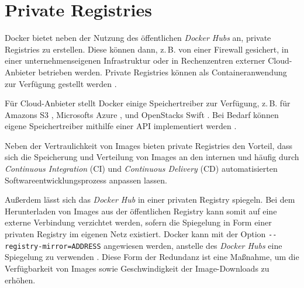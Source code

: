 \documentclass[../main.tex]{subfiles}
\begin{document}



  \section{Private Registries}
    Docker bietet neben der Nutzung des öffentlichen \emph{Docker Hubs} an, private Registries zu erstellen. Diese können dann, z.\,B. von einer Firewall gesichert, in einer unternehmenseigenen Infrastruktur oder in Rechenzentren externer Cloud-Anbieter betrieben werden. Private Registries können als Containeranwendung zur Verfügung gestellt werden \cite{dockerRegistry}.

    \clearpage

    Für Cloud-Anbieter stellt Docker einige Speichertreiber zur Verfügung, z.\,B. für Amazons S3 \cite{dockerStorageDriverS3}, Microsofts Azure \cite{dockerStorageDriverAzure}, und OpenStacks Swift \cite{dockerStorageDriverSwift}. Bei Bedarf können eigene Speichertreiber mithilfe einer API implementiert werden \cite{dockerStorageDriver}.

    Neben der Vertraulichkeit von Images bieten private Registries den Vorteil, dass sich die Speicherung und Verteilung von Images an den internen und häufig durch \emph{Continuous Integration} (\acrshort{CI}) und \emph{Continuous Delivery} (\acrshort{CD}) automatisierten Softwareentwicklungsprozess anpassen lassen.

    Außerdem lässt sich das \emph{Docker Hub} in einer privaten Registry spiegeln. Bei dem Herunterladen von Images aus der öffentlichen Registry kann somit auf eine externe Verbindung verzichtet werden, sofern die Spiegelung in Form einer privaten Registry im eigenen Netz existiert. Docker kann mit der Option \texttt{-{}-registry-mirror=ADDRESS} angewiesen werden, anstelle des \emph{Docker Hubs} eine Spiegelung zu verwenden \cite{dockerRegistryMirror}. Diese Form der Redundanz ist eine Maßnahme, um die Verfügbarkeit von Images sowie Geschwindigkeit der Image-Downloads zu erhöhen.
\end{document}
